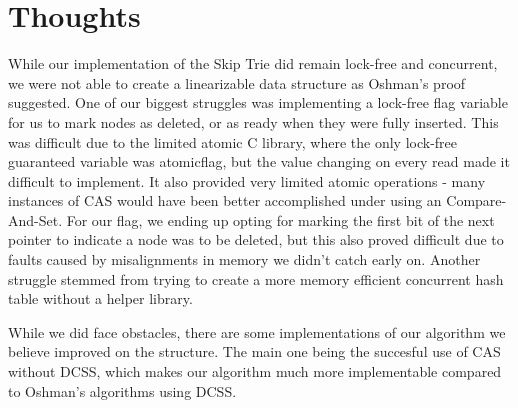 \documentclass[10pt,twocolumn]{article}
\begin{document}
\section{Thoughts}
While our implementation of the Skip Trie did remain lock-free and concurrent, we were not able to create a linearizable data structure as Oshman's proof suggested.  One of our biggest struggles was implementing a lock-free flag variable for us to mark nodes as deleted, or as ready when they were fully inserted.  This was difficult due to the limited atomic C library, where the only lock-free guaranteed variable was atomicflag, but the value changing on every read made it difficult to implement.  It also provided very limited atomic operations - many instances of CAS would have been better accomplished under using an Compare-And-Set. For our flag, we ending up opting for marking the first bit of the next pointer to indicate a node was to be deleted, but this also proved difficult due to faults caused by misalignments in memory we didn't catch early on.  Another struggle stemmed from trying to create a more memory efficient concurrent hash table without a helper library.  

While we did face obstacles, there are some implementations of our algorithm we believe improved on the structure.  The main one being the succesful use of CAS without DCSS, which makes our algorithm much more implementable compared to Oshman's algorithms using DCSS.   




\end{document}
